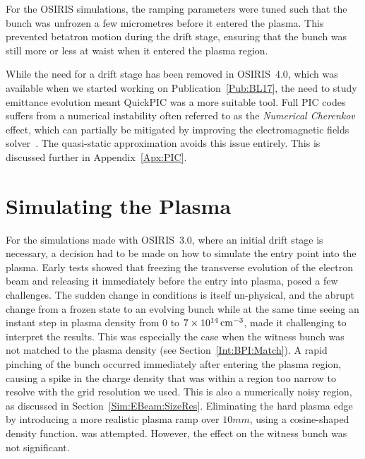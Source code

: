 For the OSIRIS simulations, the ramping parameters were tuned such that the bunch was unfrozen a few micrometres before it entered the plasma.
This prevented betatron motion during the drift stage, ensuring that the bunch was still more or less at waist when it entered the plasma region.

While the need for a drift stage has been removed in OSIRIS~4.0, which was available when we started working on Publication~\ref{Pub:BL17}, the need to study emittance evolution meant QuickPIC was a more suitable tool.
Full PIC codes suffers from a numerical instability often referred to as the \textit{Numerical Cherenkov} effect, which can partially be mitigated by improving the electromagnetic fields solver~\cite{lehe:2013}.
The quasi-static approximation avoids this issue entirely.
This is discussed further in Appendix~\ref{Apx:PIC}.

\section{Simulating the Plasma}
\label{Sim:Plasma}

For the simulations made with OSIRIS~3.0, where an initial drift stage is necessary, a decision had to be made on how to simulate the entry point into the plasma.
Early tests showed that freezing the transverse evolution of the electron beam and releasing it immediately before the entry into plasma, posed a few challenges.
The sudden change in conditions is itself un-physical, and the abrupt change from a frozen state to an evolving bunch while at the same time seeing an instant step in plasma density from $0$ to $7\times 10^{14}\,\mathrm{cm}^{-3}$, made it challenging to interpret the results.
This was especially the case when the witness bunch was not matched to the plasma density (see Section~\ref{Int:BPI:Match}).
A rapid pinching of the bunch occurred immediately after entering the plasma region, causing a spike in the charge density that was within a region too narrow to resolve with the grid resolution we used.
This is also a numerically noisy region, as discussed in Section~\ref{Sim:EBeam:SizeRes}.
Eliminating the hard plasma edge by introducing a more realistic plasma ramp over $10\unit{mm}$, using a cosine-shaped density function. was attempted.
However, the effect on the witness bunch was not significant.

